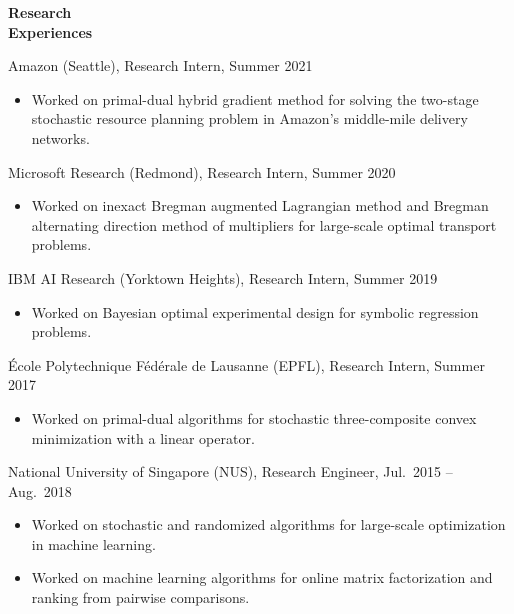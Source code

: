 \documentclass[11pt]{article}
\begin{document}
\begin{minipage}[t]{0.18\textwidth}
\textbf{Research\\ Experiences}
\end{minipage}\hfill
\begin{minipage}[t]{0.8\textwidth}

Amazon (Seattle), {Research Intern}, Summer 2021
\begin{itemize}
\item Worked on primal-dual hybrid gradient method for solving the two-stage stochastic resource planning problem in Amazon's middle-mile delivery networks.  
\end{itemize}


Microsoft Research (Redmond), {Research Intern}, Summer 2020
\begin{itemize}
\item Worked on inexact Bregman augmented Lagrangian method and Bregman alternating direction method of multipliers for large-scale optimal transport problems. 
\end{itemize}

IBM AI Research (Yorktown Heights), {Research Intern}, Summer 2019%
\begin{itemize}


\item Worked on Bayesian optimal experimental design for symbolic regression problems.
\end{itemize}

\'Ecole Polytechnique F\'ed\'erale de Lausanne (EPFL), {Research Intern}, Summer 2017
\begin{itemize}
\item Worked on primal-dual algorithms for stochastic three-composite convex minimization with a linear operator.
\end{itemize} 


National University of Singapore (NUS), {Research Engineer}, Jul.\ 2015 -- Aug.\ 2018
\begin{itemize}
\item %
Worked on stochastic and randomized algorithms for large-scale optimization in machine learning.
\item %
Worked on machine learning algorithms for online matrix factorization  and ranking from pairwise comparisons. %
\end{itemize}




\end{minipage}
\end{document}
